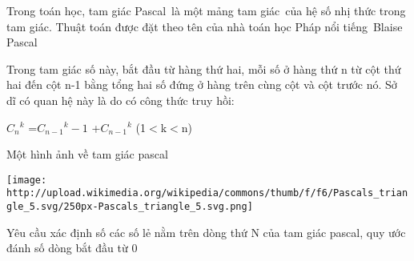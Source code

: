 Trong toán học, tam giác Pascal là một mảng tam giác của hệ số nhị thức trong tam giác. Thuật toán được đặt theo tên của nhà toán học Pháp nổi tiếng Blaise Pascal  

   Trong tam giác số này, bắt đầu từ hàng thứ hai, mỗi số ở hàng thứ n từ cột thứ hai đến cột n-1 bằng tổng hai số đứng ở hàng trên cùng cột và cột trước nó. Sở dĩ có quan hệ này là do có công thức truy hồi:  

   $C_{n}$$^    k   $   =$C_{n-1}$$^    k-1   $   +$C_{n-1}$$^    k   $   (1$<$k$<$n)  

   Một hình ảnh về tam giác pascal  


\texttt{[image: http://upload.wikimedia.org/wikipedia/commons/thumb/f/f6/Pascals\_triangle\_5.svg/250px-Pascals\_triangle\_5.svg.png]}

   Yêu cầu xác định số các số lẻ nằm trên dòng thứ N của tam giác pascal, quy ước đánh số dòng bắt đầu từ 0